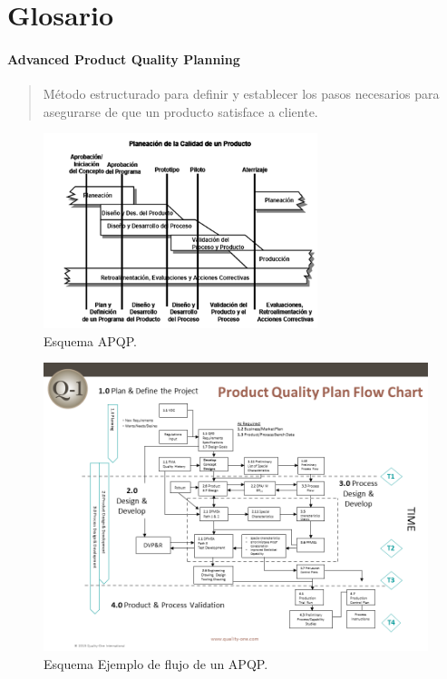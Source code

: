 \documentclass[oneside]{book}
\begin{document}
\pagebreak[4]
\section*{Glosario}

\paragraph{Advanced Product Quality Planning}
\begin{quote}
	Método estructurado para definir y establecer los pasos necesarios para asegurarse de que un producto satisface a cliente.
\end{quote}

\begin{figure}[H]
	\centering
	\includegraphics[width=80mm]{imagenes/APQP.png}
	\caption{Esquema APQP.}
	\label{fig:APQP}
\end{figure}

\begin{figure}[H]
	\centering
	\includegraphics[width=130mm]{imagenes/APQPFlowChart.png}
	\caption{Esquema Ejemplo de flujo de un APQP.}
	\label{fig:APQPFlowChart}
\end{figure}
\end{document}
